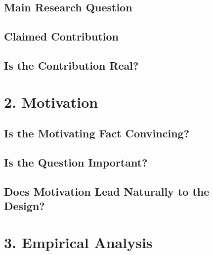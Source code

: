\documentclass[11pt, letterpaper]{article}
\begin{document}
\subsection{Main Research Question}
\vspace{2.5cm}

\subsection{Claimed Contribution}
\vspace{2.5cm}

\subsection{Is the Contribution Real?}
\vspace{3cm}

\section{2. Motivation}

\subsection{Is the Motivating Fact Convincing?}
\vspace{2.5cm}

\subsection{Is the Question Important?}
\vspace{2.5cm}

\subsection{Does Motivation Lead Naturally to the Design?}
\vspace{2cm}

\section{3. Empirical Analysis}
\end{document}
